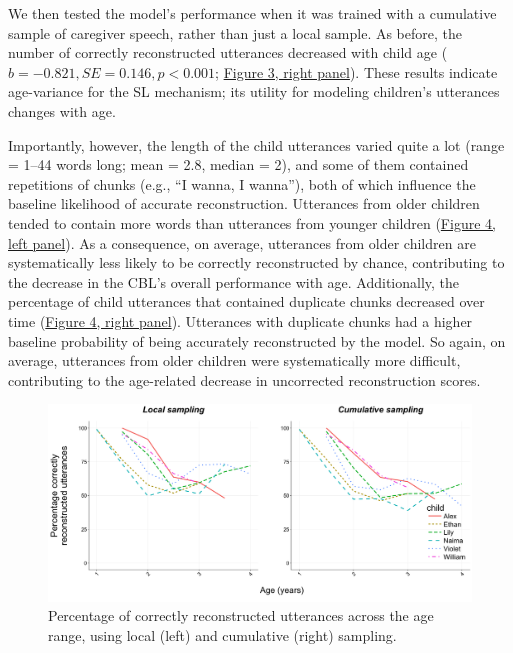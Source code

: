 \documentclass[man,mask,floatsintext]{apa6}
\begin{document}
We then tested the model's performance when it was trained with a
cumulative sample of caregiver speech, rather than just a local sample.
As before, the number of correctly reconstructed utterances decreased
with child age (\(b=-0.821, SE = 0.146, p < 0.001\);
\protect\hyperlink{fig3}{Figure 3, right panel}). These results indicate
age-variance for the SL mechanism; its utility for modeling children's
utterances changes with age.

Importantly, however, the length of the child utterances varied quite a
lot (range = 1--44 words long; mean = 2.8, median = 2), and some of them
contained repetitions of chunks (e.g., \enquote{I wanna, I wanna}), both
of which influence the baseline likelihood of accurate reconstruction.
Utterances from older children tended to contain more words than
utterances from younger children (\protect\hyperlink{fig4}{Figure 4,
left panel}). As a consequence, on average, utterances from older
children are systematically less likely to be correctly reconstructed by
chance, contributing to the decrease in the CBL's overall performance
with age. Additionally, the percentage of child utterances that
contained duplicate chunks decreased over time
(\protect\hyperlink{fig4}{Figure 4, right panel}). Utterances with
duplicate chunks had a higher baseline probability of being accurately
reconstructed by the model. So again, on average, utterances from older
children were systematically more difficult, contributing to the
age-related decrease in uncorrected reconstruction scores.

\begin{figure}

{\centering \includegraphics[width=0.95\linewidth]{images/plotbothreconstruction_perc} 

}

\caption{Percentage of correctly reconstructed utterances across the age range, using local (left) and cumulative (right) sampling.}\label{fig:fig3}
\end{figure}
\end{document}
